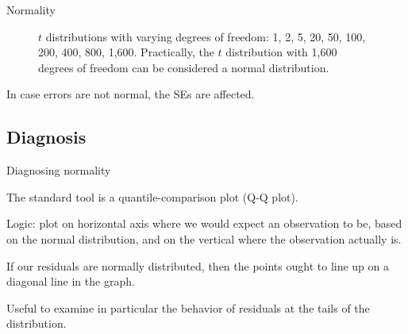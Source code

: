\documentclass[12pt,english,pdf,xcolor=dvipsnames,aspectratio=169,handout]{beamer}\usepackage[]{graphicx}\usepackage[]{xcolor}
\begin{document}
\begin{frame}[fragile]{Normality}

\begin{figure}[ht]
  \centering
  \caption{\label{fig:fig-8} $t$ distributions with varying degrees of freedom: 1, 2, 5, 20, 50, 100, 200, 400, 800, 1,600. Practically, the $t$ distribution with 1,600 degrees of freedom can be considered a normal distribution.}
\end{figure}

In case errors are not normal, the SEs are affected.
\end{frame}


\subsection{Diagnosis}

\begin{frame}{Diagnosing normality}

The standard tool is a quantile-comparison plot (Q-Q plot).\bigskip

Logic: plot on horizontal axis where we would expect an observation to be, based on the normal distribution, and on the vertical where the observation actually is.\bigskip

If our residuals are normally distributed, then the points ought to line up on a diagonal line in the graph.\bigskip

Useful to examine in particular the behavior of residuals at the tails of the distribution.

\end{frame}
\end{document}
